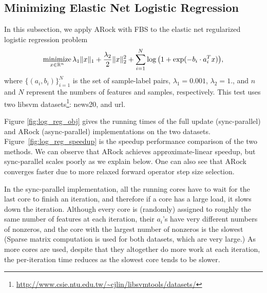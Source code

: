 \subsection{Minimizing Elastic Net Logistic Regression}
In this subsection, we apply ARock with FBS to the elastic net regularized logistic regression problem
\begin{equation}\label{eqn:l12_log}
\operatorname*{minimize}_{x \in \mathbb{R}^n} \lambda_1 \|x\|_1 + \frac{\lambda_2}{2} \|x\|^2_2 + \sum_{i=1}^N \log\big(1 + \exp(-b_i \cdot a_i^T x)\big),
\end{equation}
where $\{(a_i, b_i)\}_{i=1}^N$ is the set of sample-label pairs, $\lambda_1=0.001$, $\lambda_2 = 1.$, and $n$ and $N$ represent the numbers of features and samples, respectively. This test uses two libsvm datasets\footnote{\url{http://www.csie.ntu.edu.tw/~cjlin/libsvmtools/datasets/}}: news20, and url.

Figure \ref{fig:log_reg_obj} gives the running times of  the full update (sync-parallel) and ARock (async-parallel) implementations on the two datasets. Figure~\ref{fig:log_reg_speedup} is the speedup performance comparison of the two methods. We can observe that ARock achieves approximate-linear speedup, but sync-parallel scales poorly as we explain below. One can also see that ARock converges faster due to more relaxed forward operator step size selection. 

In the sync-parallel implementation,  all the running cores have to wait for the last core to finish an iteration, and therefore if a core has a large load, it slows down the iteration. Although every core is (randomly) assigned to roughly the same number of features at each iteration, their  $a_i$'s have very different numbers of nonzeros, and the core with the largest number of nonzeros is the slowest (Sparse matrix computation is used for both datasets, which are very large.) As more cores are used,  despite that they altogether do more work at each iteration,  the per-iteration time reduces as the slowest core tends to be slower.



